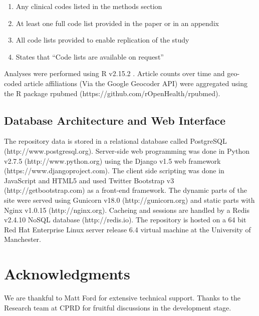 \documentclass[10pt]{article}
\begin{document}
\begin{enumerate}
    \item Any clinical codes listed in the methods section
    \item At least one full code list provided in the paper or in an appendix
    \item All code lists provided to enable replication of the study
    \item States that ``Code lists are available on request'' 
\end{enumerate}

Analyses were performed using R v2.15.2 \cite{R2012}. Article counts over time and geo-coded article affiliations (Via the Google Geocoder API) were aggregated using the R package rpubmed (https://github.com\slash rOpenHealth/rpubmed).

\subsection*{Database Architecture and Web Interface}

The repository data is stored in a relational database called PostgreSQL (http://www.postgresql.org). Server-side web programming was done in Python v2.7.5 (http://www.python.org) using the Django v1.5 web framework (https://www.djangoproject.com). The client side scripting was done in JavaScript and HTML5 and used Twitter Bootstrap v3 (http://getbootstrap.com) as a front-end framework.  The dynamic parts of the site were served using Gunicorn v18.0 (http://gunicorn.org) and static parts with Nginx v1.0.15 (http://nginx.org). Cacheing and sessions are handled by a Redis v2.4.10 NoSQL database (http://redis.io). The repository is hosted on a 64 bit Red Hat Enterprise Linux server release 6.4 virtual machine at the University of Manchester. 


\section*{Acknowledgments}
We are thankful to Matt Ford for extensive technical support. Thanks to the Research team at CPRD for fruitful discussions in the development stage.

\end{document}
